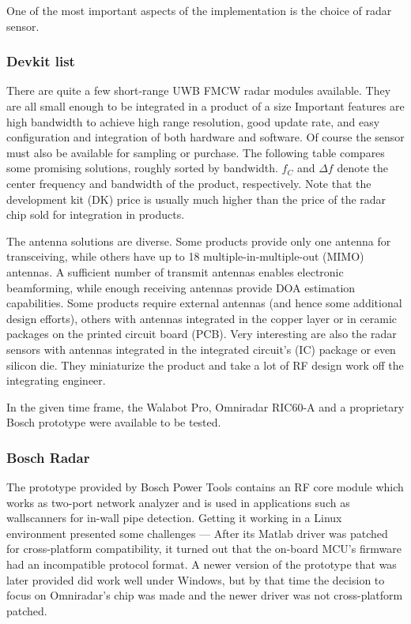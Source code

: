 One of the most important aspects of the implementation is the choice of radar sensor.

\subsubsection{Devkit list}\label{devkit-list}

There are quite a few short-range UWB FMCW radar modules available. They are all small enough to be integrated in a product of a size Important features are high bandwidth to achieve high range resolution, good update rate, and easy configuration and integration of both hardware and software. Of course the sensor must also be available for sampling or purchase. The following table compares some promising solutions, roughly sorted by bandwidth. $f_C$ and $\Delta f$ denote the center frequency and bandwidth of the product, respectively. Note that the development kit (DK) price is usually much higher than the price of the radar chip sold for integration in products.



The antenna solutions are diverse. Some products provide only one antenna for transceiving, while others have up to 18 multiple-in-multiple-out (MIMO) antennas. A sufficient number of transmit antennas enables electronic beamforming, while enough receiving antennas provide DOA estimation capabilities. Some products require external antennas (and hence some additional design efforts), others with antennas integrated in the copper layer or in ceramic packages on the printed circuit board (PCB). Very interesting are also the radar sensors with antennas integrated in the integrated circuit's (IC) package or even silicon die. They miniaturize the product and take a lot of RF design work off the integrating engineer.

In the given time frame, the Walabot Pro, Omniradar RIC60-A and a proprietary Bosch prototype were available to be tested.

\subsubsection{Bosch Radar}\label{bosch-radar}

The prototype provided by Bosch Power Tools contains an RF core module which works as two-port network analyzer and is used in applications such as wallscanners for in-wall pipe detection. Getting it working in a Linux environment presented some challenges --- After its Matlab driver was patched for cross-platform compatibility, it turned out that the on-board MCU's firmware had an incompatible protocol format. A newer version of the prototype that was later provided did work well under Windows, but by that time the decision to focus on Omniradar's chip was made and the newer driver was not cross-platform patched.

